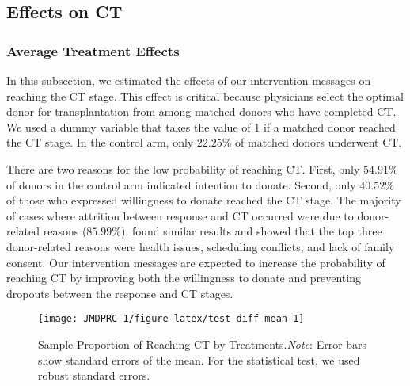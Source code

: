 \documentclass[12pt, a4paper]{article}
\begin{document}
\hypertarget{main}{%
\subsection{Effects on CT}\label{main}}

\hypertarget{average-treatment-effects}{%
\subsubsection{Average Treatment Effects}\label{average-treatment-effects}}

In this subsection, we estimated the effects of our intervention messages on reaching the CT stage. This effect is critical because physicians select the optimal donor for transplantation from among matched donors who have completed CT. We used a dummy variable that takes the value of 1 if a matched donor reached the CT stage. In the control arm, only \(22.25\)\% of matched donors underwent CT.

There are two reasons for the low probability of reaching CT. First, only \(54.91\)\% of donors in the control arm indicated intention to donate. Second, only \(40.52\)\% of those who expressed willingness to donate reached the CT stage. The majority of cases where attrition between response and CT occurred were due to donor-related reasons (\(85.99\)\%). \citet{Hirakawa2018} found similar results and showed that the top three donor-related reasons were health issues, scheduling conflicts, and lack of family consent. Our intervention messages are expected to increase the probability of reaching CT by improving both the willingness to donate and preventing dropouts between the response and CT stages.

\begin{figure}[t]
\texttt{[image: JMDPRC~1/figure-latex/test-diff-mean-1]} \caption{Sample Proportion of Reaching CT by Treatments.\newline \emph{Note}: Error bars show standard errors of the mean. For the statistical test, we used robust standard errors.}\label{fig:test-diff-mean}
\end{figure}
\end{document}
